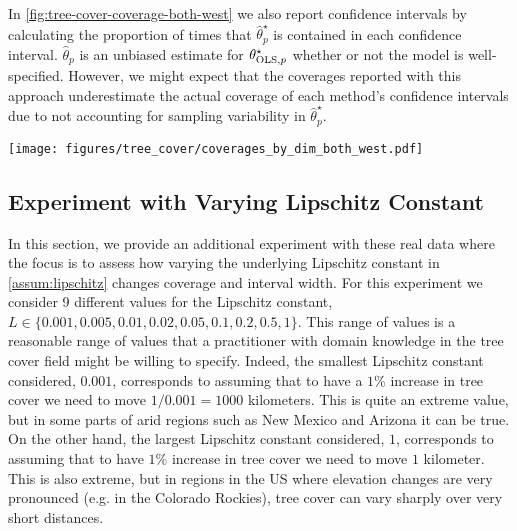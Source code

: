 In \cref{fig:tree-cover-coverage-both-west} we also report confidence intervals by calculating the proportion of times that $\hat{\theta}_p^{\star}$ is contained in each confidence interval. $\hat{\theta}_p $ is an unbiased estimate for $\theta^{\star}_{\text{OLS},p}$ whether or not the model is well-specified. However, we might expect that the coverages reported with this approach underestimate the actual coverage of each method's confidence intervals due to not accounting for sampling variability in $\hat{\theta}_p^{\star}$.

\begin{figure*}[!ht]
    \centering    \texttt{[image: figures/tree\_cover/coverages\_by\_dim\_both\_west.pdf]}
    \caption{Coverages for the difference (upper), coverages for the point estimate (middle), and confidence interval widths (lower) for our method as well as 5 other methods for the West US data. Each column represents a parameter in the tree cover experiment. Only our method consistently achieves the nominal coverage.}
    \label{fig:tree-cover-coverage-both-west}
\end{figure*}

\subsection{Experiment with Varying Lipschitz Constant}
\label{app:tree-cover-varying-lipschitz}

In this section, we provide an additional experiment with these real data where the focus is to assess how varying the underlying Lipschitz constant in \cref{assum:lipschitz} changes coverage and interval width. For this experiment we consider 9 different values for the Lipschitz constant, $L \in \{0.001, 0.005, 0.01, 0.02, 0.05, 0.1, 0.2, 0.5, 1\}$. This range of values is a reasonable range of values that a practitioner with domain knowledge in the tree cover field might be willing to specify. Indeed, the smallest Lipschitz constant considered, $0.001$, corresponds to assuming that to have a $1\%$ increase in tree cover we need to move $1/0.001 = 1000$ kilometers. This is quite an extreme value, but in some parts of arid regions such as New Mexico and Arizona it can be true. On the other hand, the largest Lipschitz constant considered, $1$, corresponds to assuming that to have $1\%$ increase in tree cover we need to move $1$ kilometer. This is also extreme, but in regions in the US where elevation changes are very pronounced (e.g. in the Colorado Rockies), tree cover can vary sharply over very short distances. 

